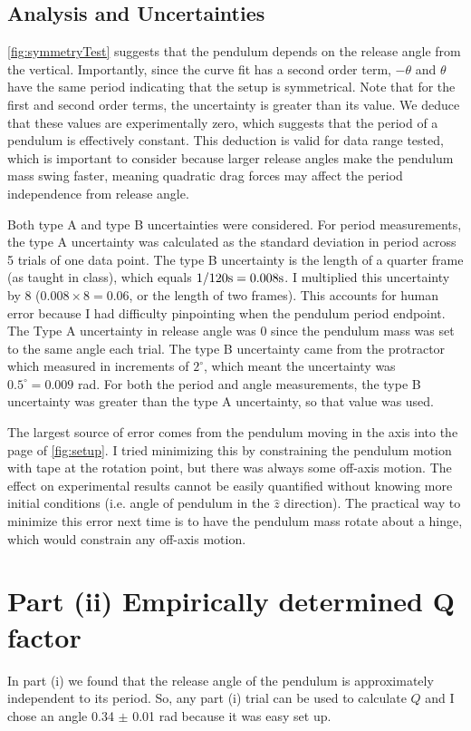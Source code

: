 \documentclass[notitlepage, twocolumn, 12pt]{article}
\begin{document}
    \subsection*{Analysis and Uncertainties}
    \cref{fig:symmetryTest} suggests that the pendulum depends on the release angle from the vertical. Importantly, since the curve fit has a second order term, $-\theta$ and $\theta$ have the same period indicating that the setup is symmetrical. Note that for the first and second order terms, the uncertainty is greater than its value. We deduce that these values are experimentally zero, which suggests that the period of a pendulum is effectively constant. This deduction is valid for data range tested, which is important to consider because larger release angles make the pendulum mass swing faster, meaning quadratic drag forces may affect the period independence from release angle.

    Both type A and type B uncertainties were considered. For period measurements, the type A uncertainty was calculated as the standard deviation in period across 5 trials of one data point. The type B uncertainty is the length of a quarter frame (as taught in class), which equals $1/120 \rm{s} = 0.008 \rm{s}$. I multiplied this uncertainty by 8 ($0.008 \times 8 = 0.06$, or the length of two frames). This accounts for human error because I had difficulty pinpointing when the pendulum period endpoint. The Type A uncertainty in release angle was 0 since the pendulum mass was set to the same angle each trial. The type B uncertainty came from the protractor which measured in increments of $2^\circ$, which meant the uncertainty was $0.5^\circ = 0.009$ rad. 
    For both the period and angle measurements, the type B uncertainty was greater than the type A uncertainty, so that value was used. 

    The largest source of error comes from the pendulum moving in the axis into the page of \cref{fig:setup}. I tried minimizing this by constraining the pendulum motion with tape at the rotation point, but there was always some off-axis motion. The effect on experimental results cannot be easily quantified without knowing more initial conditions (i.e. angle of pendulum in the $\hat{z}$ direction). The practical way to minimize this error next time is to have the pendulum mass rotate about a hinge, which would constrain any off-axis motion.  
    \section*{Part (ii) Empirically determined Q factor}
    In part (i) we found that the release angle of the pendulum is approximately independent to its period. So, any part (i) trial can be used to calculate $Q$ and I chose an angle 0.34 $\pm$ 0.01 rad because it was easy set up.
\end{document}
